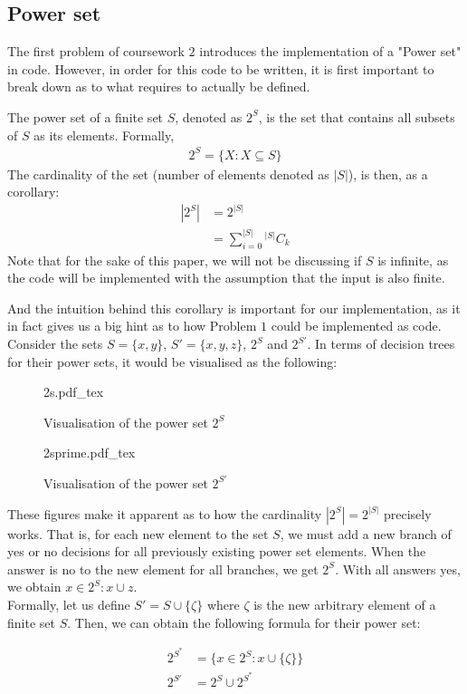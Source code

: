 \documentclass[a4paper]{article}
\newcommand{\incfig}[2][1]{%
    \def\svgwidth{#1\columnwidth}
    {#2.pdf_tex}
}
\theoremstyle{plain}
\theoremstyle{definition}
\newtheorem{defn}{Definition}[section]
\theoremstyle{remark}
\begin{document}
\subsection{Power set}
The first problem of coursework $2$ introduces the implementation of a "Power set" in code. However, in order for this code to be written, it is first important to break down as to what requires to actually be defined.
\begin{tcolorbox}[colback=black!3!white,colframe=black!60!white,title=\begin{defn}Power Set \label{Power Set}\end{defn}]
The power set of a finite set $S$, denoted as $2^{S}$, is the set that contains all subsets of $S$ as its elements. Formally, 
\begin{align*}
	2^{S} = \{ X : X \subseteq S \}
\end{align*}
The cardinality of the set (number of elements denoted as $|S|$), is then, as a corollary:
\begin{align*}
	|2^{S}|&=2^{|S|} \\
	       &=\sum_{i=0}^{|S|} {}^{|S|}C_k
\end{align*}
Note that for the sake of this paper, we will not be discussing if $S$ is infinite, as the code will be implemented with the assumption that the input is also finite.
\end{tcolorbox}
\begin{flushleft}
And the intuition behind this corollary is important for our implementation, as it in fact gives us a big hint as to how Problem $1$ could be implemented as code. Consider the sets $S = \{x,y\}$, $S' = \{ x,y,z \}$, $2^{S}$ and $2^{S'}$. In terms of decision trees for their power sets, it would be visualised as the following:
\end{flushleft}
\begin{figure}[H]
    \centering
    \incfig[0.8]{2s}
    \caption{Visualisation of the power set $2^{S}$}
    \label{fig:2s}
\end{figure}
\begin{figure}[H]
    \centering
    \incfig[0.9]{2sprime}
    \caption{Visualisation of the power set $2^{S'}$}
    \label{fig:2sprime}
\end{figure}
\begin{flushleft}
These figures make it apparent as to how the cardinality $|2^{S}| = 2^{|S|}$ precisely works. That is, for each new element to the set $S$, we must add a new branch of yes or no decisions for all previously existing power set elements. When the answer is no to the new element for all branches, we get $2^{S}$. With all answers yes, we obtain $x \in 2^{S} : x \cup z$. \\

Formally, let us define $S' = S \cup \{ \zeta \}$ where $\zeta$ is the new arbitrary element of a finite set $S$. Then, we can obtain the following formula for their power set:
\end{flushleft}
\begin{align*}
	2^{S^{*}} &= \{ x \in 2^S : x \cup \{ \zeta \}\}\\
	2^{S'} &= 2^S \cup 2^{S^{*}}
\end{align*}
\end{document}
